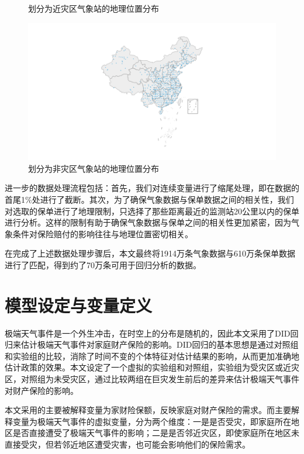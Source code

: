 \begin{figure}[H]
\begin{minipage}{0.48\linewidth}
        \caption{划分为近灾区气象站的地理位置分布}
    \end{minipage}
    \begin{minipage}{0.48\linewidth}
        \includegraphics[width=\textwidth, trim=200 0 200 0]{lib/img/far.png}
        \caption{划分为非灾区气象站的地理位置分布}
    \end{minipage}
\end{figure}

进一步的数据处理流程包括：首先，我们对连续变量进行了缩尾处理，即在数据的首尾1\%处进行了截断。其次，为了确保气象数据与保单数据之间的相关性，我们对选取的保单进行了地理限制，只选择了那些距离最近的监测站20公里以内的保单进行分析。这样的限制有助于确保气象数据与保单之间的相关性更加紧密，因为气象条件对保险赔付的影响往往与地理位置密切相关。

在完成了上述数据处理步骤后，本文最终将1914万条气象数据与610万条保单数据进行了匹配，得到约了70万条可用于回归分析的数据。

\section{模型设定与变量定义}

极端天气事件是一个外生冲击，在时空上的分布是随机的，因此本文采用了DID回归来估计极端天气事件对家庭财产保险的影响。DID回归的基本思想是通过对照组和实验组的比较，消除了时间不变的个体特征对估计结果的影响，从而更加准确地估计政策的效果。本文设定了一个虚拟的实验组和对照组，实验组为受灾区或近灾区，对照组为未受灾区，通过比较两组在巨灾发生前后的差异来估计极端天气事件对财产保险的影响。

本文采用的主要被解释变量为家财险保额，反映家庭对财产保险的需求。而主要解释变量为极端天气事件的虚拟变量，分为两个维度：一是是否受灾，即家庭所在地区是否直接遭受了极端天气事件的影响；二是是否邻近灾区，即使家庭所在地区未直接受灾，但若邻近地区遭受灾害，也可能会影响他们的保险需求。

